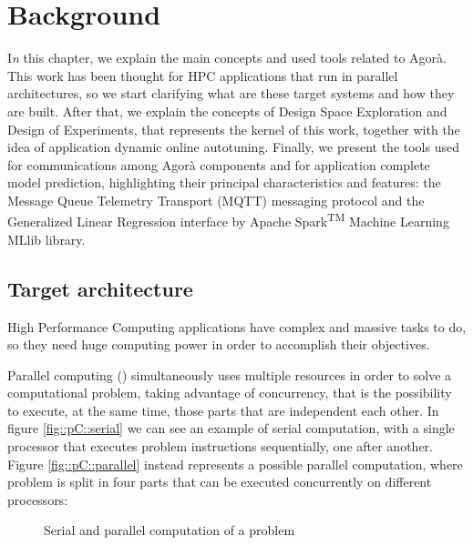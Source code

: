 \chapter{Background}\label{back}

\lettrine{I}{}\textit{n} this chapter, we explain the main concepts and used tools related to Agorà. This work has been thought for HPC applications that run in parallel architectures, so we start clarifying what are these target systems and how they are built. After that, we explain the concepts of Design Space Exploration and Design of Experiments, that represents the kernel of this work, together with the idea of application dynamic online autotuning. Finally, we present the tools used for communications among Agorà components and for application complete model prediction, highlighting their principal characteristics and features: the Message Queue Telemetry Transport (MQTT) messaging protocol and the Generalized Linear Regression interface by Apache Spark\textsuperscript{TM} Machine Learning MLlib library.

\section{Target architecture}

High Performance Computing applications have complex and massive tasks to do, so they need huge computing power in order to accomplish their objectives.

Parallel computing (\cite{barney2012introduction}) simultaneously uses multiple re\-sourc\-es in order to solve a computational problem, taking advantage of concurrency, that is the possibility to execute, at the same time, those parts that are independent each other. In figure \ref{fig::pC::serial} we can see an example of serial computation, with a single processor that executes problem instructions sequentially, one after another. Figure \ref{fig::pC::parallel} instead represents a possible parallel computation, where problem is split in four parts that can be executed concurrently on different processors:

\begin{figure}[H]

    \centering

    \enskip
    
    \caption{Serial and parallel computation of a problem}

\end{figure}

